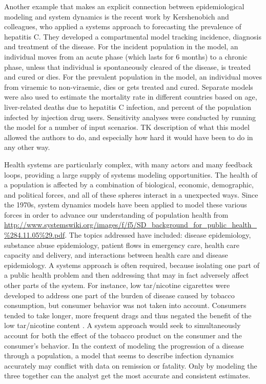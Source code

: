 Another example that makes an explicit connection between
epidemiological modeling and system dynamics is the recent work by
Kershenobich and colleagues, who applied a systems approach to
forecasting the prevalence of hepatitis C. They developed a
compartmental model tracking incidence, diagnosis and treatment of the
disease. For the incident population in the model, an individual moves
from an acute phase (which lasts for 6 months) to a chronic phase,
unless that individual is spontaneously cleared of the disease, is
treated and cured or dies. For the prevalent population in the model,
an individual moves from viraemic to non-viraemic, dies or gets
treated and cured. Separate models were also used to estimate the
mortality rate in different countries based on age, liver-related
deaths due to hepatitis C infection, and percent of the population
infected by injection drug users. Sensitivity analyses were conducted
by running the model for a number of input scenarios.  TK description
of what this model allowed the authors to do, and especially how hard
it would have been to do in any other way.

Health systems are particularly complex, with many actors and many
feedback loops, providing a large supply of systems modeling
opportunities. The health of a population is affected by a combination
of biological, economic, demographic, and political forces, and all of
these spheres interact in a unexpected ways. Since the 1970s, system
dynamics models have been applied to model these various forces in
order to advance our understanding of population health \cite{refs}
  from \url{http://www.systemswiki.org/images/f/f5/SD_background_for_public_health_%284.11.05%29.pdf}. The topics addressed have included: disease
  epidemiology, substance abuse epidemiology, patient flows in
  emergency care, health care capacity and delivery, and interactions
  between health care and disease epidemiology. A systems approach is
  often required, because isolating one part of a public health
  problem and then addressing that may in fact adversely affect other
  parts of the system. For instance, low tar/nicotine cigarettes were
  developed to address one part of the burden of disease caused by
  tobacco consumption, but consumer behavior was not taken into
  account. Consumers tended to take longer, more frequent drags and
  thus negated the benefit of the low tar/nicotine content
  \cite{Sterman_Learning_2006,[ref [KP8]TK]}. A system approach would
  seek to simultaneously account for both the effect of the tobacco
  product on the consumer and the consumer's behavior. In the context
  of modeling the progression of a disease through a population, a
  model that seems to describe infection dynamics accurately may
  conflict with data on remission or fatality. Only by modeling the
  three together can the analyst get the most accurate and consistent
  estimates.

